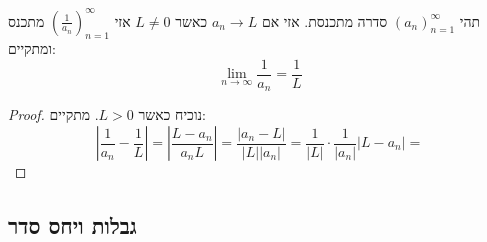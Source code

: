 \documentclass{tstextbook}
\begin{document}
\begin{theorem}
תהי \((a_n)_{n=1}^\infty\) סדרה מתכנסת. אזי אם \(a_{n}\to L\) כאשר \(L\neq 0\) אזי \(\left( \frac{1}{a_{n}} \right)_{n=1}^\infty\) מתכנס ומתקיים:
$$\lim_{ n \to \infty } \frac{1}{a_{n}}=\frac{1}{L}$$

\end{theorem}
\begin{proof}
נוכיח כאשר \(L>0\). מתקיים:
$$\left\lvert  \frac{1}{a_{n}}-\frac{1}{L}  \right\rvert =\left\lvert  \frac{L - a_{n}}{a_{n}L}  \right\rvert =\frac{|a_{n}-L|}{|L||a_{n}|}=\frac{1}{|L|}\cdot \frac{1}{|a_{n}|}|L-a_{n}|=$$

\end{proof}
\subsection{גבלות ויחס סדר}
\end{document}
